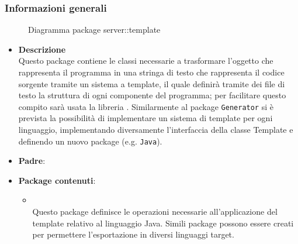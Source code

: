 \subsubsection{Informazioni generali}
\begin{figure}[H]
	\caption{Diagramma package server::template}
\end{figure}
\begin{itemize}
\item \textbf{Descrizione}\\
Questo package contiene le classi necessarie a trasformare l'oggetto che rappresenta il programma in una stringa di testo che rappresenta il codice sorgente tramite un sistema a template, il quale definirà tramite dei file di testo la struttura di ogni componente del programma; per facilitare questo compito sarà usata la libreria \stringtemplate{}. Similarmente al package \texttt{Generator} si è prevista la possibilità di implementare un sistema di template per ogni linguaggio, implementando diversamente l'interfaccia della classe Template e definendo un nuovo package (e.g. \texttt{Java}).
\item \textbf{Padre}: \hyperref[\nogloxy{swedesigner::server}]{}
\item \textbf{Package contenuti}:
\begin{itemize}
\item \hyperref[\nogloxy{swedesigner::server::template::java}]{}\\
Questo package definisce le operazioni necessarie all'applicazione del template relativo al linguaggio Java. Simili package possono essere creati per permettere l'esportazione in diversi linguaggi target.
\end{itemize}
\end{itemize}
